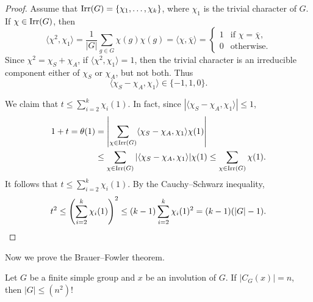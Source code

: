 \begin{proof}
    Assume that $\operatorname{Irr}(G)=\{\chi_1,\dots,\chi_k\}$, where $\chi_1$ is the
    trivial character of $G$. 
    If $\chi\in\operatorname{Irr}(G)$, then 
    \[
        \langle\chi^2,\chi_1\rangle=\frac{1}{|G|}\sum_{g\in G}\chi(g)\chi(g)=\langle\chi,\overline{\chi}\rangle=\begin{cases}
        1 & \text{if $\chi=\overline{\chi}$},\\
        0 & \text{otherwise}.
        \end{cases}
    \]
    Since $\chi^2=\chi_S+\chi_A$, if $\langle\chi^2,\chi_1\rangle=1$, then
    the trivial character is an irreducible component either of $\chi_S$ or $\chi_A$, but not both. 
    Thus
    \[
    \langle\chi_S-\chi_A,\chi_1\rangle\in\{-1,1,0\}.
    \]
    
    We claim that 
    $t\leq\sum_{i=2}^k\chi_i(1)$. In fact, since 
    $|\langle\chi_S-\chi_A,\chi_1\rangle|\leq 1$, 
    \begin{align*}
        1+t=\theta(1)
        &=\left|\sum_{\chi\in\operatorname{Irr}(G)}\langle\chi_S-\chi_A,\chi_1\rangle\chi(1)\right|\\
        &\leq\sum_{\chi\in\operatorname{Irr}(G)}|\langle\chi_S-\chi_A,\chi_1\rangle|\chi(1)
        \leq\sum_{\chi\in\operatorname{Irr}(G)}\chi(1).
    \end{align*}
    It follows that $t\leq\sum_{i=2}^k\chi_i(1)$. 
    By the Cauchy--Schwarz inequality, 
    \[
        t^2\leq\left(\sum_{i=2}^k\chi_i(1)\right)^2
        \leq(k-1)\sum_{i=2}^k\chi_i(1)^2=(k-1)(|G|-1).\qedhere
    \]
\end{proof}

Now we prove the Brauer--Fowler theorem. 

\begin{theorem}
    Let $G$ be a finite simple group and $x$ be an involution of $G$. If $|C_G(x)|=n$, then $|G|\leq (n^2)!$	
\end{theorem}

